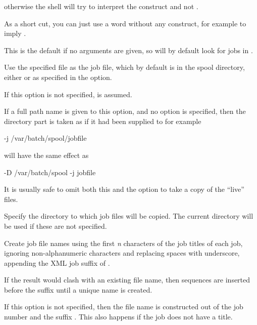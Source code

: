 otherwise the shell will try to interpret the \exampletext{\$} construct and not \PrXbCjlistx{}.

As a short cut, you can just use a word without any \exampletext{\$} construct, for example  to imply
.

This is the default if no arguments are given, so \PrXbCjlistx{} will by default look for jobs
in \linebreak[3]\spooldir.


Use the specified file as the job file, which by default is  in the spool directory, either \spooldir{} or as
specified in the  option.

If this option is not specified,  is assumed.

If a full path name is given to this option, and no  option is specified, then the directory part is taken as if it had
been supplied to  for example

\begin{expara}

\XbCjlistxName{} -j /var/batch/spool/jobfile

\end{expara}

will have the same effect as

\begin{expara}

\XbCjlistxName{} -D /var/batch/spool -j jobfile

\end{expara}

It is usually safe to omit both this and the  option to take a copy of the ``live'' files.


Specify the directory to which job files will be copied. The current directory will be used if these are not specified.


Create job file names using the first \textit{n} characters of the job titles of each job, ignoring non-alphanumeric characters and replacing spaces
with underscore, appending the XML job suffix of \batchjobsuffix.

If the result would clash with an existing file name, then  sequences are inserted before the suffix until a unique name is
created.

If this option is not specified, then the file name is constructed out of the job number and the suffix \batchjobsuffix. This also happens if the
job does not have a title.

